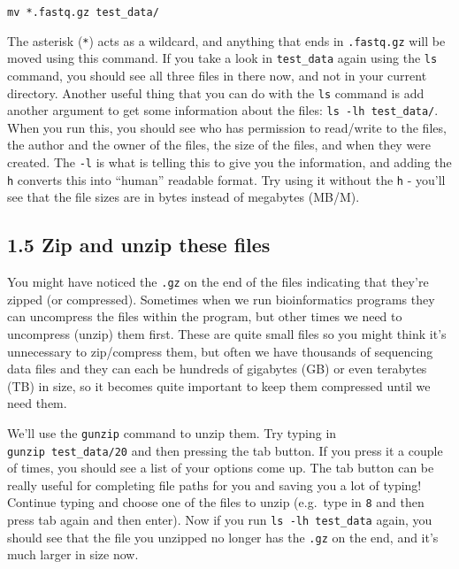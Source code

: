 \documentclass[
]{book}
\begin{document}
\begin{verbatim}
mv *.fastq.gz test_data/
\end{verbatim}

The asterisk (\texttt{*}) acts as a wildcard, and anything that ends in \texttt{.fastq.gz} will be moved using this command. If you take a look in \texttt{test\_data} again using the \texttt{ls} command, you should see all three files in there now, and not in your current directory. Another useful thing that you can do with the \texttt{ls} command is add another argument to get some information about the files: \texttt{ls\ -lh\ test\_data/}. When you run this, you should see who has permission to read/write to the files, the author and the owner of the files, the size of the files, and when they were created. The \texttt{-l} is what is telling this to give you the information, and adding the \texttt{h} converts this into ``human'' readable format. Try using it without the \texttt{h} - you'll see that the file sizes are in bytes instead of megabytes (MB/M).

\subsection{1.5 Zip and unzip these files}\label{zip-and-unzip-these-files}

You might have noticed the \texttt{.gz} on the end of the files indicating that they're zipped (or compressed). Sometimes when we run bioinformatics programs they can uncompress the files within the program, but other times we need to uncompress (unzip) them first. These are quite small files so you might think it's unnecessary to zip/compress them, but often we have thousands of sequencing data files and they can each be hundreds of gigabytes (GB) or even terabytes (TB) in size, so it becomes quite important to keep them compressed until we need them.

We'll use the \texttt{gunzip} command to unzip them. Try typing in \texttt{gunzip\ test\_data/20} and then pressing the tab button. If you press it a couple of times, you should see a list of your options come up. The tab button can be really useful for completing file paths for you and saving you a lot of typing! Continue typing and choose one of the files to unzip (e.g.~type in \texttt{8} and then press tab again and then enter).
Now if you run \texttt{ls\ -lh\ test\_data} again, you should see that the file you unzipped no longer has the \texttt{.gz} on the end, and it's much larger in size now.
\end{document}
